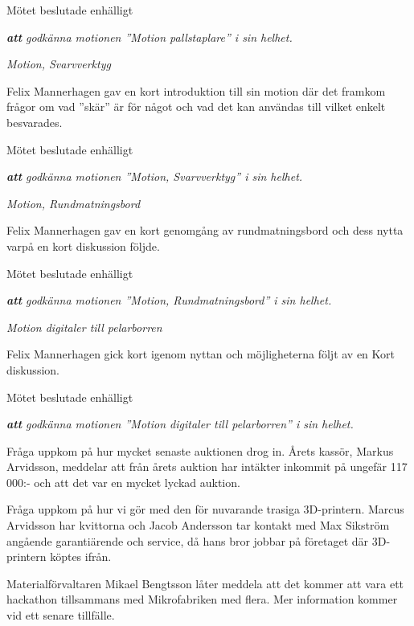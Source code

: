     Mötet beslutade enhälligt
    
    \emph{\textbf{att} godkänna motionen ''Motion pallstaplare'' i sin helhet.}
    
    \vspace{0.2in}
    
    \emph{Motion, Svarvverktyg}
    
    Felix Mannerhagen gav en kort introduktion till sin motion där det framkom frågor om vad ''skär'' är för något och vad det kan användas till vilket enkelt besvarades.
    

    Mötet beslutade enhälligt
    
    \emph{\textbf{att} godkänna motionen ''Motion, Svarvverktyg'' i sin helhet.}

    \vspace{0.2in}

    \emph{Motion, Rundmatningsbord}  
    
    Felix Mannerhagen gav en kort genomgång av rundmatningsbord och dess nytta varpå en kort diskussion följde.
    

    Mötet beslutade enhälligt
    
    \emph{\textbf{att} godkänna motionen ''Motion, Rundmatningsbord'' i sin helhet.}
    
   \vspace{0.2in}
    
    \emph{Motion digitaler till pelarborren}
    
    Felix Mannerhagen gick kort igenom nyttan och möjligheterna följt av en Kort diskussion. 
         
    Mötet beslutade enhälligt
    
    \emph{\textbf{att} godkänna motionen ''Motion digitaler till pelarborren'' i sin helhet.}





Fråga uppkom på hur mycket senaste auktionen drog in. Årets kassör, Markus Arvidsson, meddelar att från årets auktion har intäkter inkommit på ungefär 117 000:- och att det var en mycket lyckad auktion.

Fråga uppkom på hur vi gör med den för nuvarande trasiga 3D-printern. Marcus Arvidsson har kvittorna och Jacob Andersson tar kontakt med Max Sikström angående garantiärende och service, då hans bror jobbar på företaget där 3D-printern köptes ifrån.

Materialförvaltaren Mikael Bengtsson låter meddela att det kommer att vara ett hackathon tillsammans med Mikrofabriken med flera. Mer information kommer vid ett senare tillfälle.

